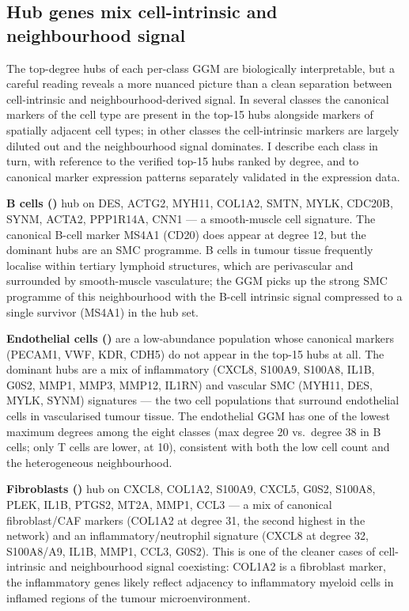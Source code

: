 \subsection*{Hub genes mix cell-intrinsic and neighbourhood signal}

The top-degree hubs of each per-class GGM are biologically interpretable, but a careful reading reveals a more nuanced picture than a clean separation between cell-intrinsic and neighbourhood-derived signal. In several classes the canonical markers of the cell type are present in the top-15 hubs alongside markers of spatially adjacent cell types; in other classes the cell-intrinsic markers are largely diluted out and the neighbourhood signal dominates. I describe each class in turn, with reference to the verified top-15 hubs ranked by degree, and to canonical marker expression patterns separately validated in the expression data.

\textbf{B cells ()} hub on DES, ACTG2, MYH11, COL1A2, SMTN, MYLK, CDC20B, SYNM, ACTA2, PPP1R14A, CNN1 --- a smooth-muscle cell signature. The canonical B-cell marker MS4A1 (CD20) does appear at degree 12, but the dominant hubs are an SMC programme. B cells in tumour tissue frequently localise within tertiary lymphoid structures, which are perivascular and surrounded by smooth-muscle vasculature; the GGM picks up the strong SMC programme of this neighbourhood with the B-cell intrinsic signal compressed to a single survivor (MS4A1) in the hub set.

\textbf{Endothelial cells ()} are a low-abundance population whose canonical markers (PECAM1, VWF, KDR, CDH5) do not appear in the top-15 hubs at all. The dominant hubs are a mix of inflammatory (CXCL8, S100A9, S100A8, IL1B, G0S2, MMP1, MMP3, MMP12, IL1RN) and vascular SMC (MYH11, DES, MYLK, SYNM) signatures --- the two cell populations that surround endothelial cells in vascularised tumour tissue. The endothelial GGM has one of the lowest maximum degrees among the eight classes (max degree 20 vs.\ degree 38 in B cells; only T cells are lower, at 10), consistent with both the low cell count and the heterogeneous neighbourhood.

\textbf{Fibroblasts ()} hub on CXCL8, COL1A2, S100A9, CXCL5, G0S2, S100A8, PLEK, IL1B, PTGS2, MT2A, MMP1, CCL3 --- a mix of canonical fibroblast/CAF markers (COL1A2 at degree 31, the second highest in the network) and an inflammatory/neutrophil signature (CXCL8 at degree 32, S100A8/A9, IL1B, MMP1, CCL3, G0S2). This is one of the cleaner cases of cell-intrinsic and neighbourhood signal coexisting: COL1A2 is a fibroblast marker, the inflammatory genes likely reflect adjacency to inflammatory myeloid cells in inflamed regions of the tumour microenvironment.

